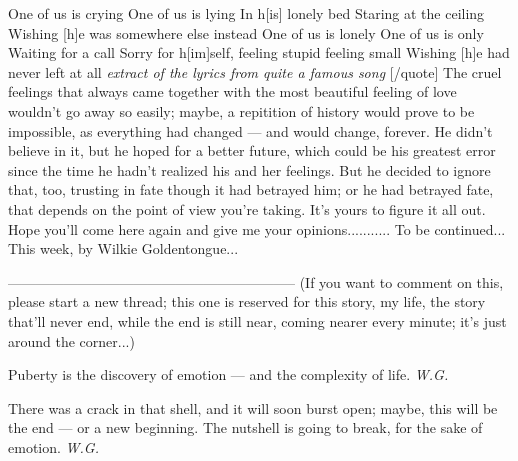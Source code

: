 One of us is crying 
One of us is lying 
In h[is] lonely bed 
Staring at the ceiling 
Wishing [h]e was somewhere else instead 
One of us is lonely 
One of us is only 
Waiting for a call 
Sorry for h[im]self, feeling stupid feeling small 
Wishing [h]e had never left at all 
\emph{extract of the lyrics from quite a famous song}
[/quote]
The cruel feelings that always came together with the most beautiful feeling of love wouldn't go away so easily; maybe, a repitition of history would prove to be impossible, as everything had changed --- and would change, forever. 
He didn't believe in it, but he hoped for a better future, which could be his greatest error since the time he hadn't realized his and her feelings. 
But he decided to ignore that, too, trusting in fate though it had betrayed him; or he had betrayed fate, that depends on the point of view you're taking. 
It's yours to figure it all out. 
Hope you'll come here again and give me your opinions...........
To be continued...
This week, by Wilkie Goldentongue...

--------------------------------------------------------------
(If you want to comment on this, please start a new thread; this one is reserved for this story, my life, the story that'll never end, while the end is still near, coming nearer every minute; it's just around the corner...)

Puberty is the discovery of emotion --- and the complexity of life. 
\emph{W.G.}

There was a crack in that shell,
and it will soon burst open;
maybe, this will be the end --- 
or a new beginning. 
The nutshell is going to break,
for the sake
of emotion. 
\emph{W.G.}

